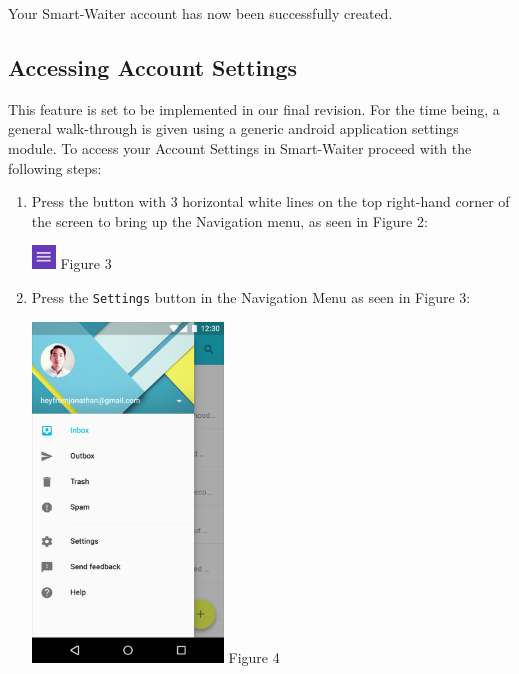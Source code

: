 \documentclass[12pt, titlepage]{article}
\begin{document}
Your Smart-Waiter account has now been successfully created.
\subsection{Accessing Account Settings}
This feature is set to be implemented in our final revision. For the time being, a general walk-through is given using a generic android application settings module. To access your Account Settings in Smart-Waiter proceed with the following steps:

\begin{enumerate}
	\item Press the button with 3 horizontal white lines on the top right-hand corner of the screen to bring up the Navigation menu, as seen 			in Figure 2: 
	\begin{center}
	\includegraphics[width=0.05\textwidth]{ui-fragment-button.png}
	\linebreak Figure 3
	\end{center}

	\item Press the \texttt{Settings} button in the Navigation Menu as seen 	in Figure 3:

	\begin{center}
	\includegraphics[width=0.4\textwidth]{nav-menu.png}
	\linebreak Figure 4
	\end{center}

\end{enumerate}
\end{document}
